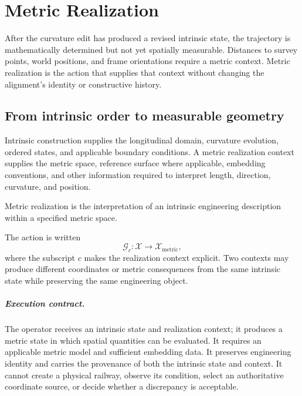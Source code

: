 
\chapter{Metric Realization}
\label{chap:metric-realization}

After the curvature edit has produced a revised intrinsic state, the
trajectory is mathematically determined but not yet spatially
measurable. Distances to survey points, world positions, and frame
orientations require a metric context. Metric realization is the action
that supplies that context without changing the alignment's identity or
constructive history.

\section{From intrinsic order to measurable geometry}

Intrinsic construction supplies the longitudinal domain, curvature
evolution, ordered states, and applicable boundary conditions. A metric
realization context supplies the metric space, reference surface where
applicable, embedding conventions, and other information required to
interpret length, direction, curvature, and position.

\begin{definition}
Metric realization is the interpretation of an intrinsic engineering
description within a specified metric space.
\end{definition}

The action is written
\[
\mathcal G_c:\mathcal X\rightarrow\mathcal X_{\mathrm{metric}},
\]
where the subscript \(c\) makes the realization context explicit. Two
contexts may produce different coordinates or metric consequences from
the same intrinsic state while preserving the same engineering object.

\paragraph{Execution contract.}
The operator receives an intrinsic state and realization context; it
produces a metric state in which spatial quantities can be evaluated. It
requires an applicable metric model and sufficient embedding data. It
preserves engineering identity and carries the provenance of both the
intrinsic state and context. It cannot create a physical railway,
observe its condition, select an authoritative coordinate source, or
decide whether a discrepancy is acceptable.

